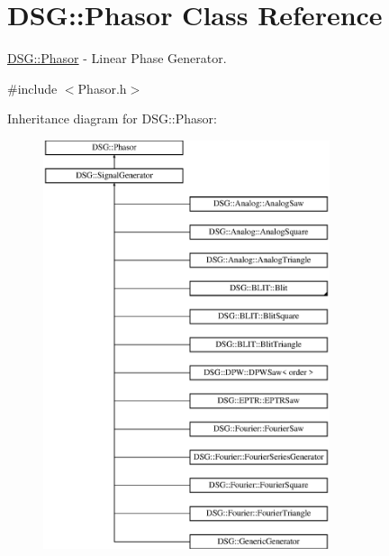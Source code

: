 \hypertarget{class_d_s_g_1_1_phasor}{\section{D\+S\+G\+:\+:Phasor Class Reference}
\label{class_d_s_g_1_1_phasor}
}


\hyperlink{class_d_s_g_1_1_phasor}{D\+S\+G\+::\+Phasor} -\/ Linear Phase Generator.  




{\ttfamily \#include $<$Phasor.\+h$>$}

Inheritance diagram for D\+S\+G\+:\+:Phasor\+:\begin{figure}[H]
\begin{center}
\leavevmode
\includegraphics[height=12.000000cm]{class_d_s_g_1_1_phasor}
\end{center}
\end{figure}
